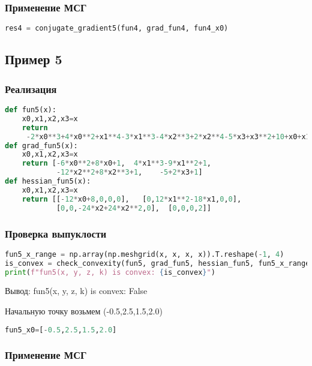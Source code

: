 \documentclass{article}
\begin{document}
\subsubsection{Применение МСГ}

\begin{lstlisting}[language=Python]
res4 = conjugate_gradient5(fun4, grad_fun4, fun4_x0)
\end{lstlisting}

\newpage


\subsection{Пример 5}

\subsubsection{Реализация}
\begin{lstlisting}[language=Python]
def fun5(x):
    x0,x1,x2,x3=x
    return
     -2*x0**3+4*x0**2+x1**4-3*x1**3-4*x2**3+2*x2**4-5*x3+x3**2+10+x0+x1+x2+x3
def grad_fun5(x):
    x0,x1,x2,x3=x
    return [-6*x0**2+8*x0+1,  4*x1**3-9*x1**2+1,
            -12*x2**2+8*x2**3+1,    -5+2*x3+1]
def hessian_fun5(x):
    x0,x1,x2,x3=x
    return [[-12*x0+8,0,0,0],   [0,12*x1**2-18*x1,0,0],
            [0,0,-24*x2+24*x2**2,0],  [0,0,0,2]]
\end{lstlisting}

\subsubsection{Проверка выпуклости}
\begin{lstlisting}[language=Python]
fun5_x_range = np.array(np.meshgrid(x, x, x, x)).T.reshape(-1, 4)
is_convex = check_convexity(fun5, grad_fun5, hessian_fun5, fun5_x_range)
print(f"fun5(x, y, z, k) is convex: {is_convex}")
\end{lstlisting}

Вывод: fun5(x, y, z, k) is convex: False

Начальную точку возьмем (-0.5,2.5,1.5,2.0)

\begin{lstlisting}[language=Python]
fun5_x0=[-0.5,2.5,1.5,2.0]
\end{lstlisting}

\subsubsection{Применение МСГ}
\end{document}
